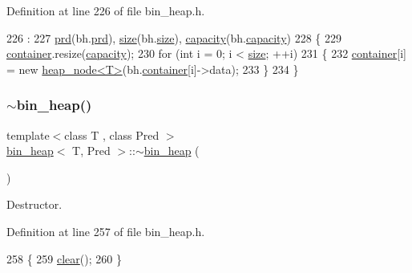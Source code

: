 Definition at line 226 of file bin\+\_\+heap.\+h.


\begin{DoxyCode}
226                                                        :
227     \mbox{\hyperlink{classbin__heap_a5ecc420dfd03a6a0b4c9328cac1fae14}{prd}}(bh.\mbox{\hyperlink{classbin__heap_a5ecc420dfd03a6a0b4c9328cac1fae14}{prd}}), \mbox{\hyperlink{classbin__heap_a8dde1008dcc24d734dbdb2c7ca50435b}{size}}(bh.\mbox{\hyperlink{classbin__heap_a8dde1008dcc24d734dbdb2c7ca50435b}{size}}), \mbox{\hyperlink{classbin__heap_ac5aa6948898bfc047cae2fe99ba28f57}{capacity}}(bh.\mbox{\hyperlink{classbin__heap_ac5aa6948898bfc047cae2fe99ba28f57}{capacity}})
228 \{
229     \mbox{\hyperlink{classbin__heap_a413200f4c6e24090c5e9a32184fc8857}{container}}.resize(\mbox{\hyperlink{classbin__heap_ac5aa6948898bfc047cae2fe99ba28f57}{capacity}});
230     \textcolor{keywordflow}{for} (\textcolor{keywordtype}{int} i = 0; i < \mbox{\hyperlink{classbin__heap_a8dde1008dcc24d734dbdb2c7ca50435b}{size}}; ++i)
231     \{
232     \mbox{\hyperlink{classbin__heap_a413200f4c6e24090c5e9a32184fc8857}{container}}[i] = \textcolor{keyword}{new} \mbox{\hyperlink{classheap__node}{heap\_node<T>}}(bh.\mbox{\hyperlink{classbin__heap_a413200f4c6e24090c5e9a32184fc8857}{container}}[i]->data);
233     \}
234 \}
\end{DoxyCode}
\mbox{\label{classbin__heap_a5283db56783a84ee28dea9d393acf905}} 
\subsubsection{\texorpdfstring{$\sim$bin\+\_\+heap()}{~bin\_heap()}}
{\footnotesize\ttfamily template$<$class T , class Pred $>$ \\
\mbox{\hyperlink{classbin__heap}{bin\+\_\+heap}}$<$ T, Pred $>$\+::$\sim$\mbox{\hyperlink{classbin__heap}{bin\+\_\+heap}} (\begin{DoxyParamCaption}{ }\end{DoxyParamCaption})}



Destructor. 



Definition at line 257 of file bin\+\_\+heap.\+h.


\begin{DoxyCode}
258 \{
259     \mbox{\hyperlink{classbin__heap_abf7a6189fcb48e435fc156f764e38f1d}{clear}}();
260 \}
\end{DoxyCode}


